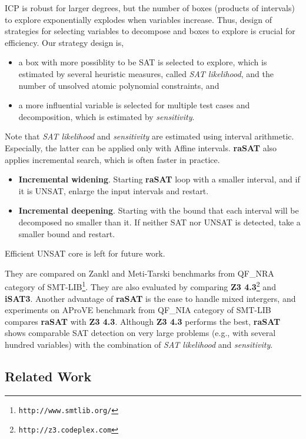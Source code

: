 \documentclass[runningheads,a4paper,oribibl]{llncs}
\begin{document}
ICP is robust for larger degrees, but the number of boxes (products of intervals) to explore 
exponentially explodes when variables increase. 
Thus, design of strategies for selecting variables to decompose and boxes to explore is crucial 
for efficiency. Our strategy design is, 
\begin{itemize}
\item a box with more possiblity to be SAT is selected to explore, which is estimated by 
several heuristic measures, called {\em SAT likelihood}, 
and the number of unsolved atomic polynomial constraints, and
\item a more influential variable is selected for multiple test cases and decomposition, 
which is estimated by {\em sensitivity}. 
\end{itemize} 
Note that {\em SAT likelihood} and {\em sensitivity} are estimated using interval arithmetic. 
Especially, the latter can be applied only with Affine intervals. 
{\bf raSAT} also applies incremental search, which is often faster in practice. 
\begin{itemize}
\item {\bf Incremental widening}. 
Starting {\bf raSAT} loop with a smaller interval, and if it is UNSAT, enlarge the input intervals
and restart. 
\item {\bf Incremental deepening}. 
Starting with the bound that each interval will be decomposed no smaller than it. 
If neither SAT nor UNSAT is detected, take a smaller bound and restart. 
\end{itemize} 
Efficient UNSAT core %
is left for future work. 

They are compared on Zankl and Meti-Tarski benchmarks from 
QF\_NRA category of SMT-LIB\footnote{\tt http://www.smtlib.org/}. 
They are also evaluated by comparing 
{\bf Z3 4.3}\footnote{\tt http://z3.codeplex.com} and {\bf iSAT3}. 
Another advantage of {\bf raSAT} is the ease to handle mixed intergers, 
and experiments on AProVE benchmark from QF\_NIA category of SMT-LIB compares {\bf raSAT} with 
{\bf Z3 4.3}. 
Although {\bf Z3 4.3} performs the best, {\bf raSAT} shows comparable SAT detection on 
very large problems (e.g., with several hundred variables) with the combination of 
{\em SAT likelihood} and {\em sensitivity}. 


\subsection*{Related Work} \label{sec:relate}
\end{document}
